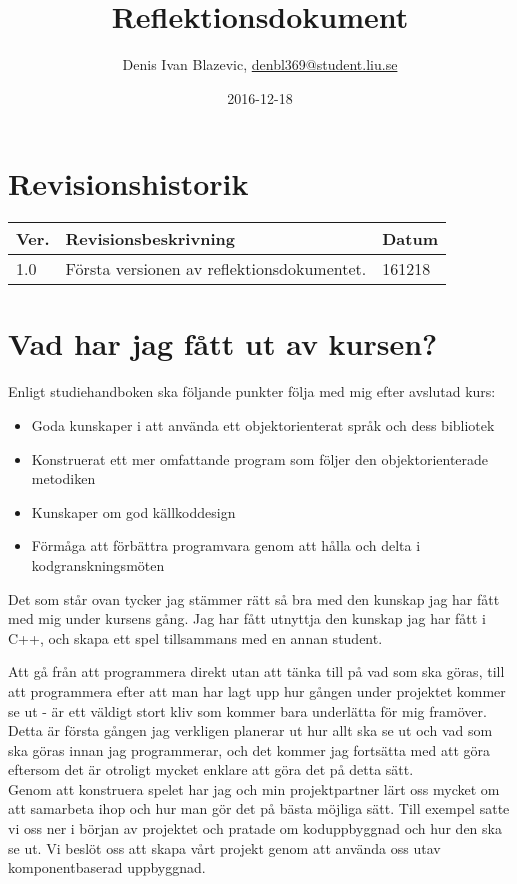 \documentclass{template}
\author{Denis Ivan Blazevic, \url{denbl369@student.liu.se}\\
    }
\title{Reflektionsdokument}
\date{2016-12-18}
\begin{document}
\projectpage

\tableofcontents
\newpage

\section{Revisionshistorik}
\begin{table}[!h]
\begin{tabularx}{\linewidth}{|l|X|l|}
\hline
Ver. & Revisionsbeskrivning & Datum \\\hline
1.0 & Första versionen av reflektionsdokumentet. & 161218 \\\hline
\end{tabularx}
\end{table}

\section{Vad har jag fått ut av kursen?}
Enligt studiehandboken ska följande punkter följa med mig efter avslutad kurs:
\begin{itemize}
    \item Goda kunskaper i att använda ett objektorienterat språk och dess bibliotek
    \item Konstruerat ett mer omfattande program som följer den objektorienterade metodiken
    \item Kunskaper om god källkoddesign
    \item Förmåga att förbättra programvara genom att hålla och delta i kodgranskningsmöten
\end{itemize}

Det som står ovan tycker jag stämmer rätt så bra med den kunskap jag har fått med mig under kursens gång. Jag har fått utnyttja den kunskap jag har fått i C++, och skapa ett spel tillsammans med en annan student. 

Att gå från att programmera direkt utan att tänka till på vad som ska göras, till att programmera efter att man har lagt upp hur gången under projektet kommer se ut - är ett väldigt stort kliv som kommer bara underlätta för mig framöver. Detta är första gången jag verkligen planerar ut hur allt ska se ut och vad som ska göras innan jag programmerar, och det kommer jag fortsätta med att göra eftersom det är otroligt mycket enklare att göra det på detta sätt.\\

Genom att konstruera spelet har jag och min projektpartner lärt oss mycket om att samarbeta ihop och hur man gör det på bästa möjliga sätt. Till exempel satte vi oss ner i början av projektet och pratade om koduppbyggnad och hur den ska se ut. Vi beslöt oss att skapa vårt projekt genom att använda oss utav komponentbaserad uppbyggnad.\\
\end{document}
